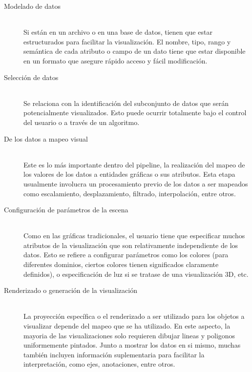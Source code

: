 \documentclass[12pt]{article}
\begin{document}
\begin{description}
	\item[Modelado de datos] \hfil \\
Si están en un archivo o en una base de datos, tienen que estar  estructurados para facilitar la visualización. El nombre, tipo, rango y semántica de cada atributo o campo de un dato tiene que estar disponible en un formato que asegure rápido acceso y fácil modificación.
	
	\item[Selección de datos] \hfill \\
Se relaciona con la identificación del subconjunto de datos que serán potencialmente visualizados. Esto puede ocurrir totalmente bajo el control del usuario o a través de un algoritmo.

	\item[De los datos a mapeo visual] \hfill \\
Este es lo más importante dentro del pipeline, la realización del mapeo de los valores de los datos a entidades gráficas o sus atributos. Esta etapa usualmente involucra un procesamiento previo de los datos a ser mapeados como escalamiento, desplazamiento, filtrado, interpolación, entre otros.

	\item[Configuración de parámetros de la escena] \hfill \\
Como en las gráficas tradicionales, el usuario tiene que especificar muchos atributos de la visualización que son relativamente independiente de los datos. Esto se refiere a configurar parámetros como los colores (para diferentes dominios, ciertos colores tienen significados claramente definidos), o especificación de luz si se tratase de una visualización 3D, etc.

	\item[Renderizado o generación de la visualización] \hfill \\
La proyección específica o el renderizado a ser utilizado para los objetos a visualizar depende del mapeo que se ha utilizado. En este aspecto, la mayoria de las visualizaciones solo requieren dibujar lineas y poligonos uniformemente pintados. Junto a mostrar los datos en si mismo, muchas también incluyen información suplementaria para facilitar la interpretación, como ejes, anotaciones, entre otros.

\end{description}
\end{document}
